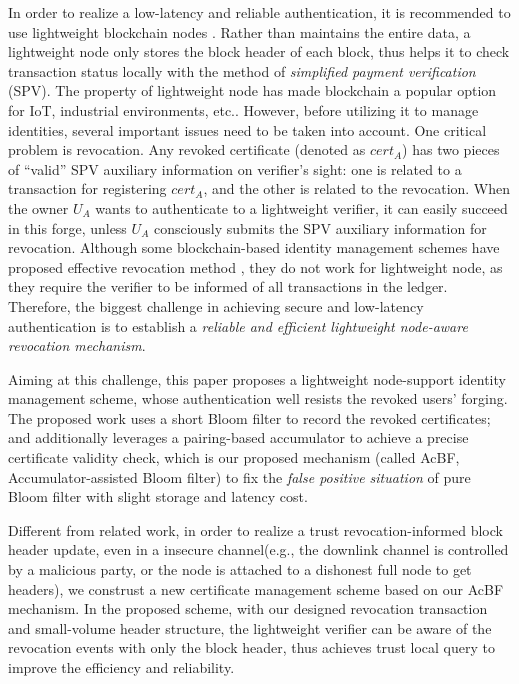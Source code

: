 \documentclass[conference]{IEEEtran}
\begin{document}
In order to realize a low-latency and reliable authentication, it is recommended to use lightweight blockchain nodes \cite{smartdid}.
Rather than maintains the entire data, a lightweight node only stores the block header of each block, thus helps it to check transaction status locally with the method of \textit{simplified payment verification} (SPV).
The property of lightweight node has made blockchain a popular option for IoT, industrial environments, etc.. However, before utilizing it to manage identities, several important issues need to be taken into account. One critical problem is revocation. Any revoked certificate (denoted as $cert_A$) has two pieces of ``valid'' SPV auxiliary information on verifier's sight: one is related to a transaction for registering $cert_A$, and the other is related to the revocation. 
When the owner $U_A$ wants to authenticate to a lightweight verifier, it can easily succeed in this forge, unless $U_A$ consciously submits the SPV auxiliary information for revocation. Although some blockchain-based identity management schemes have proposed effective revocation method \cite{luoScalaCertScalabilityOrientedPKI2022a,  wang2020blockchain,jiaRedactableBlockchainDecentralized2022,chenCertchainPublicEfficient2018a}, they do not work for lightweight node, as they require the verifier to be informed of all transactions in the ledger. Therefore, the biggest challenge in achieving secure and low-latency authentication is to establish a \textit{reliable and efficient lightweight node-aware revocation mechanism}.

Aiming at this challenge, this paper proposes a lightweight node-support identity management scheme, whose authentication well resists the revoked users' forging. The proposed work uses a short Bloom filter to record the revoked certificates; and additionally leverages a pairing-based accumulator to achieve a precise certificate validity check, which is our proposed mechanism (called AcBF, Accumulator-assisted Bloom filter) to fix the \textit{false positive situation} of pure Bloom filter with slight storage and latency cost. 

Different from related work, in order to realize a trust revocation-informed block header update, even in a insecure channel(e.g., the downlink channel is controlled by a malicious party, or the node is attached to a dishonest full node to get headers), we construst a new certificate management scheme based on our AcBF mechanism. In the proposed scheme, with our designed revocation transaction and small-volume header structure, the lightweight verifier can be aware of the revocation events with only the block header, thus achieves trust local query to improve the efficiency and reliability. 
\end{document}
